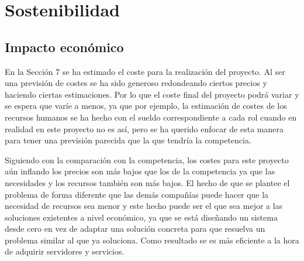 \chapter{Sostenibilidad}
\section{Impacto económico}
En la Sección 7 se ha estimado el coste para la realización del proyecto. Al ser una previsión de costes se ha sido generoso redondeando ciertos precios y haciendo ciertas estimaciones. Por lo que el coste final del proyecto podrá variar y se espera que varíe a menos, ya que por ejemplo, la estimación de costes de los recursos humanos se ha hecho con el sueldo correspondiente a cada rol cuando en realidad en este proyecto no es así, pero se ha querido enfocar de esta manera para tener una previsión parecida que la que tendría la competencia. 

Siguiendo con la comparación con la competencia, los costes para este proyecto aún inflando los precios son más bajos que los de la competencia ya que las necesidades y los recursos también son más bajos. El hecho de que se plantee el problema de forma diferente que las demás compañías puede hacer que la necesidad de recursos sea menor y este hecho puede ser el que sea mejor a las soluciones existentes a nivel económico, ya que se está diseñando un sistema desde cero en vez de adaptar una solución concreta para que resuelva un problema similar al que ya soluciona. Como resultado se es más eficiente a la hora de adquirir servidores y servicios.

